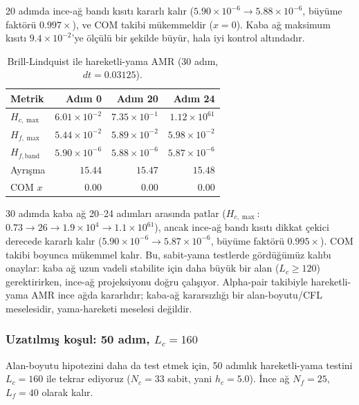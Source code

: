 20 adımda ince-ağ bandı kısıtı kararlı kalır ($5.90\times 10^{-6} \to 5.88\times 10^{-6}$, büyüme faktörü $0.997\times$), ve COM takibi mükemmeldir ($x=0$). Kaba ağ maksimum kısıtı $9.4\times 10^{-2}$'ye ölçülü bir şekilde büyür, hala iyi kontrol altındadır.

\begin{table}[t]
\centering
\caption{Brill-Lindquist ile hareketli-yama AMR (30 adım, $dt=0.03125$).}
\label{tab:amr-moving-30}
\begin{tabular}{lrrr}
\hline
Metrik & Adım 0 & Adım 20 & Adım 24 \\
\hline
$H_{c,\max}$ & $6.01\times 10^{-2}$ & $7.35\times 10^{-1}$ & $1.12\times 10^{61}$ \\
$H_{f,\max}$ & $5.44\times 10^{-2}$ & $5.89\times 10^{-2}$ & $5.98\times 10^{-2}$ \\
$H_{f,\text{band}}$ & $5.90\times 10^{-6}$ & $5.88\times 10^{-6}$ & $5.87\times 10^{-6}$ \\
Ayrışma & $15.44$ & $15.47$ & $15.48$ \\
COM $x$ & $0.00$ & $0.00$ & $0.00$ \\
\hline
\end{tabular}
\end{table}

30 adımda kaba ağ 20--24 adımları arasında patlar ($H_{c,\max}$: $0.73 \to 26 \to 1.9\times 10^4 \to 1.1\times 10^{61}$), ancak ince-ağ bandı kısıtı dikkat çekici derecede kararlı kalır ($5.90\times 10^{-6} \to 5.87\times 10^{-6}$, büyüme faktörü $0.995\times$). COM takibi boyunca mükemmel kalır. Bu, sabit-yama testlerde gördüğümüz kalıbı onaylar: kaba ağ uzun vadeli stabilite için daha büyük bir alan ($L_c \ge 120$) gerektirirken, ince-ağ projeksiyonu doğru çalışıyor. Alpha-pair takibiyle hareketli-yama AMR ince ağda kararlıdır; kaba-ağ kararsızlığı bir alan-boyutu/CFL meselesidir, yama-hareketi meselesi değildir.

\subsubsection{Uzatılmış koşul: 50 adım, $L_c=160$}

Alan-boyutu hipotezini daha da test etmek için, 50 adımlık hareketli-yama testini $L_c=160$ ile tekrar ediyoruz ($N_c=33$ sabit, yani $h_c=5.0$). İnce ağ $N_f=25$, $L_f=40$ olarak kalır.

